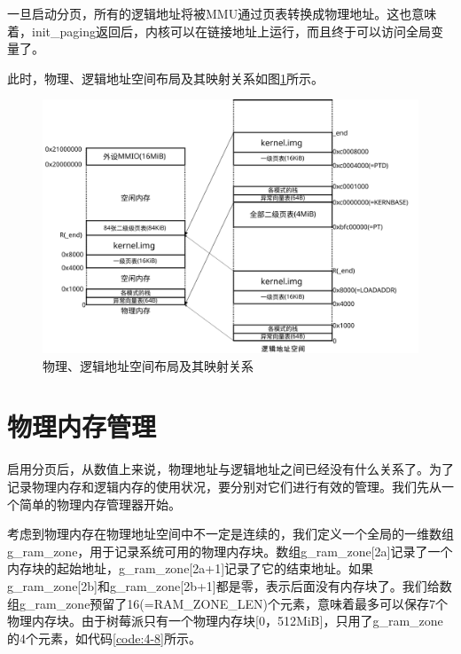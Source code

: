 \documentclass[main.tex]{subfiles}
\begin{document}
\begin{CJK*}{UTF8}{song}
\begin{code}
\label{code:4-7}
\inputminted[firstline=195,lastline=217,linenos,numbersep=5pt,frame=lines,framesep=2mm]{c}{src/chapter04/kernel/machdep.c}
\end{code}

\noindent
一旦启动分页，所有的逻辑地址将被MMU通过页表转换成物理地址。这也意味着，init\_paging返回后，内核可以在链接地址上运行，而且终于可以访问全局变量了。

\par
此时，物理、逻辑地址空间布局及其映射关系如图\ref{figure:4-7}所示。

\begin{figure}[htp]
\centering
\includegraphics[scale=0.4]{figures/4-7}
\caption{物理、逻辑地址空间布局及其映射关系}
\label{figure:4-7}
\end{figure}

\section{物理内存管理}
启用分页后，从数值上来说，物理地址与逻辑地址之间已经没有什么关系了。为了记录物理内存和逻辑内存的使用状况，要分别对它们进行有效的管理。我们先从一个简单的物理内存管理器开始。

\par
考虑到物理内存在物理地址空间中不一定是连续的，我们定义一个全局的一维数组g\_ram\_zone，用于记录系统可用的物理内存块。数组g\_ram\_zone[2a]记录了一个内存块的起始地址，g\_ram\_zone[2a+1]记录了它的结束地址。如果g\_ram\_zone[2b]和g\_ram\_zone[2b+1]都是零，表示后面没有内存块了。我们给数组g\_ram\_zone预留了16(=RAM\_ZONE\_LEN)个元素，意味着最多可以保存7个物理内存块。由于树莓派只有一个物理内存块[0，512MiB]，只用了g\_ram\_zone的4个元素，如代码\ref{code:4-8}所示。


\end{CJK*}
\end{document}
